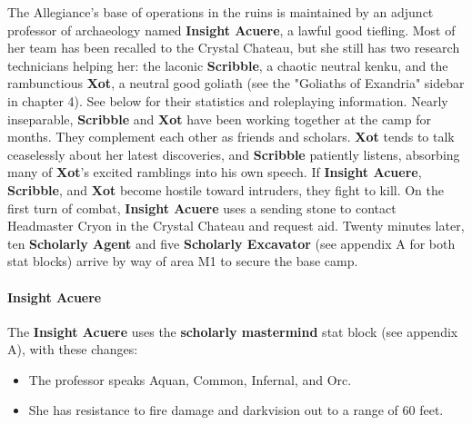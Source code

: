 \documentclass[10pt,a4,twoside,twocolumn,openany,nodeprecatedcode]{dndbook}
\begin{document}
The Allegiance's base of operations in the ruins is maintained by an adjunct professor of archaeology named \textbf{Insight Acuere}, a lawful good tiefling. Most of her team has been recalled to the Crystal Chateau, but she still has two research technicians helping her: the laconic \textbf{Scribble}, a chaotic neutral kenku, and the rambunctious \textbf{Xot}, a neutral good goliath (see the "Goliaths of Exandria" sidebar in chapter 4). See below for their statistics and roleplaying information.
Nearly inseparable, \textbf{Scribble} and \textbf{Xot} have been working together at the camp for months. They complement each other as friends and scholars. \textbf{Xot} tends to talk ceaselessly about her latest discoveries, and \textbf{Scribble} patiently listens, absorbing many of \textbf{Xot}'s excited ramblings into his own speech.
If \textbf{Insight Acuere}, \textbf{Scribble}, and \textbf{Xot} become hostile toward intruders, they fight to kill. On the first turn of combat, \textbf{Insight Acuere} uses a sending stone to contact Headmaster Cryon in the Crystal Chateau and request aid. Twenty minutes later, ten \textbf{Scholarly Agent} and five \textbf{Scholarly Excavator} (see appendix A for both stat blocks) arrive by way of area M1 to secure the base camp.
\paragraph{Insight Acuere}
The \textbf{Insight Acuere} uses the \textbf{scholarly mastermind} stat block (see appendix A), with these changes:
\begin{itemize}

\item The professor speaks Aquan, Common, Infernal, and Orc.
\item She has resistance to fire damage and darkvision out to a range of 60 feet.
\end{itemize}
\end{document}
